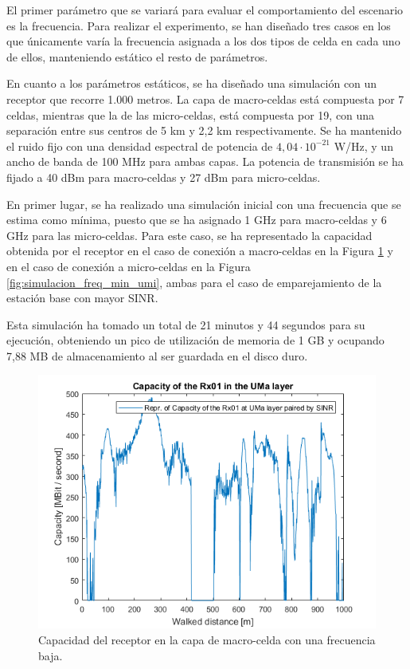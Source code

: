 El primer parámetro que se variará para evaluar el comportamiento del escenario es la frecuencia. Para realizar el experimento, se han diseñado tres casos en los que únicamente varía la frecuencia asignada a los dos tipos de celda en cada uno de ellos, manteniendo estático el resto de parámetros.

En cuanto a los parámetros estáticos, se ha diseñado una simulación con un receptor que recorre 1.000 metros. La capa de macro-celdas está compuesta por 7 celdas, mientras que la de las micro-celdas, está compuesta por 19, con una separación entre sus centros de 5 km y 2,2 km respectivamente. Se ha mantenido el ruido fijo con una densidad espectral de potencia de $4,04·10^{-21}$ W/Hz, y un ancho de banda de 100 MHz para ambas capas. La potencia de transmisión se ha fijado a 40 dBm para macro-celdas y 27 dBm para micro-celdas.

En primer lugar, se ha realizado una simulación inicial con una frecuencia que se estima como mínima, puesto que se ha asignado 1 GHz para macro-celdas y 6 GHz para las micro-celdas. Para este caso, se ha representado la capacidad obtenida por el receptor en el caso de conexión a macro-celdas en la Figura \ref{fig:simulacion_freq_min_uma} y en el caso de conexión a micro-celdas en la Figura \ref{fig:simulacion_freq_min_umi}, ambas para el caso de emparejamiento de la estación base con mayor SINR.

Esta simulación ha tomado un total de 21 minutos y 44 segundos para su ejecución, obteniendo un pico de utilización de memoria de 1 GB y ocupando 7,88 MB de almacenamiento al ser guardada en el disco duro.

\begin{figure}[h!]
	\centering
    \includegraphics[width=0.8\linewidth]{imagenes/6_3_capacidad_uma_minimo.png}
	\caption{Capacidad del receptor en la capa de macro-celda con una frecuencia baja.}
	\label{fig:simulacion_freq_min_uma}
\end{figure}

